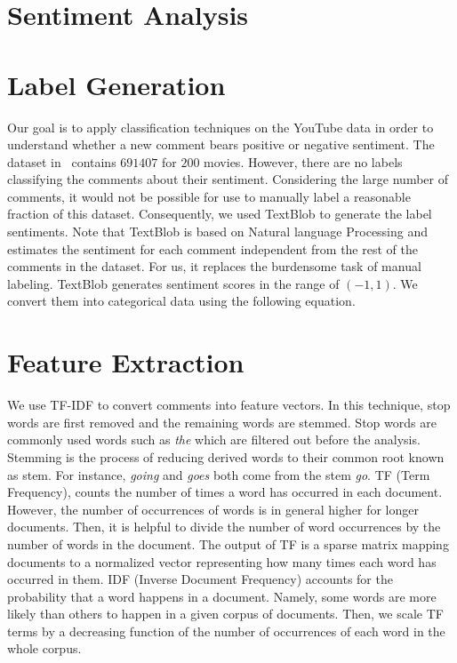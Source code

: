 \section{Sentiment Analysis}
\label{sec:sentiment}

\section{Label Generation}
\label{sec:label}
Our goal is to apply classification techniques on the YouTube data in order to understand whether a new comment bears positive or negative sentiment. The dataset in~\cite{youtubedata} contains $691407$ for $200$ movies. However, there are no labels classifying the comments about their sentiment. Considering the large number of comments, it would not be possible for use to manually label a reasonable fraction of this dataset. Consequently, we used TextBlob to generate the label sentiments. Note that TextBlob is based on Natural language Processing and estimates the sentiment for each comment independent from the rest of the comments in the dataset. For us, it replaces the burdensome task of manual labeling. TextBlob generates sentiment scores in the range of $(-1,1)$. We convert them into categorical data using the following equation. 

\section{Feature Extraction}
\label{sec:feature}
We use TF-IDF to convert comments into feature vectors. In this technique, stop words are first removed and the remaining words are stemmed. Stop words are commonly used words such as \textit{the} which are filtered out before the analysis. Stemming is the process of reducing derived words to their common root known as stem. For instance, \textit{going} and \textit{goes} both come from the stem \textit{go}. TF (Term Frequency), counts the number of times a word has occurred in each document. However, the number of occurrences of words is in general higher for longer documents. Then, it is helpful to divide the number of word occurrences by the number of words in the document. The output of TF is a sparse matrix mapping documents to a normalized vector representing how many times each word has occurred in them. IDF (Inverse Document Frequency) accounts for the probability that a word happens in a document. Namely, some words are more likely than others to happen in a given corpus of documents. Then, we scale TF terms by a decreasing function of the number of occurrences of each word in the whole corpus.

